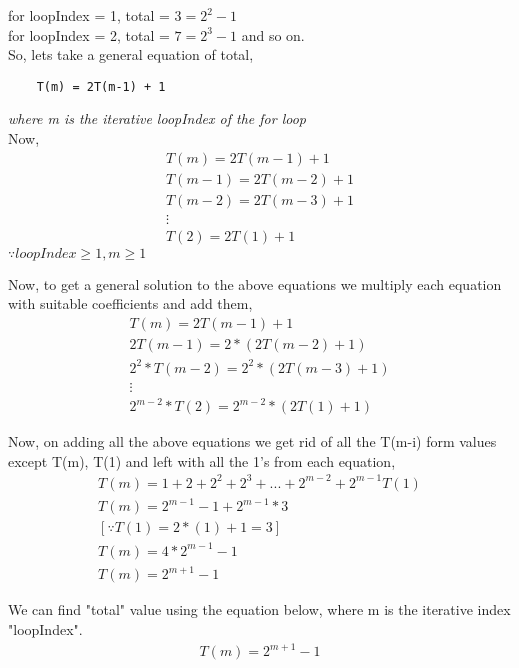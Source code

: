 \documentclass[journal,12pt,twocolumn]{IEEEtran}
\begin{document}
for loopIndex = 1, total = $3 = 2^{2} - 1$ \\
for loopIndex = 2, total = $7 = 2^{3} - 1$ and so on.\\

So, lets take a general equation of total, \\ 
\begin{lstlisting}
    T(m) = 2T(m-1) + 1
\end{lstlisting}
{\emph {where m is the iterative loopIndex of the for loop}}\\

Now,
\begin{gather*}
    T(m) = 2T(m-1) + 1 \\
    T(m-1) = 2T(m-2) + 1 \\
    T(m-2) = 2T(m-3) + 1 \\
    \vdots\\
    T(2) = 2T(1) + 1   
\end{gather*}
$\because loopIndex\ge1, m\ge1$

Now, to get a general solution to the above equations we multiply each equation with suitable coefficients and add them, \\
\begin{gather*}
    T(m) = 2T(m-1) + 1 \\
    2T(m-1) = 2*(2T(m-2) + 1) \\
    2^{2}*T(m-2) = 2^{2}*(2T(m-3) + 1) \\
    \vdots\\
    2^{m-2}*T(2) = 2^{m-2}*(2T(1) + 1) 
\end{gather*}

Now, on adding all the above equations we get rid of all the T(m-i) form values except T(m), T(1) and left with all the 1's from each equation,
\begin{gather*}
    T(m) = 1 + 2 + 2^{2} + 2^{3} + ... + 2^{m-2} + {2^{m-1}}T(1) \\ 
    T(m) = 2^{m-1} - 1 + 2^{m-1}*3 \\
    [\because T(1) = 2*(1) + 1 = 3] \\ 
    T(m) = 4*2^{m-1} - 1 \\
    T(m) = 2^{m+1} - 1
\end{gather*}

We can find "total" value using the equation below, where m is the iterative index "loopIndex".
\begin{gather}
    T(m) = 2^{m+1} - 1
\end{gather}
\end{document}

